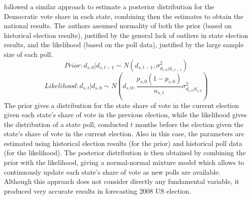 \documentclass[
  12pt]{article}
\begin{document}
\citep{loc:gel:2010} followed a similar approach to estimate a posterior
distribution for the Democratic vote share in each state, combining then
the estimates to obtain the national results. The authors assumed
normality of both the prior (based on historical election results),
justified by the general lack of outliers in state election results, and
the likelihood (based on the poll data), justified by the large sample
size of each poll.
\[Prior: d_{s,0}|d_{s,t-1} \sim N(d_{s,t-1}, \sigma^2_{d_{s,0}|d_{s,t-1}})\]
\[Likelihood: d_{s,t}|d_{s,0} \sim N(d_{s,0}, \frac{p_{s,0}(1-p_{s,0})}{n_{s,t}} \sigma^2_{d_{s,t}|d_{s,0}})\]
The prior gives a distribution for the state share of vote in the
current election given each state's share of vote in the previous
election, while the likelihood gives the distribution of a state poll,
conducted \(t\) months before the election given the state's share of
vote in the current election. Also in this case, the parameters are
estimated using historical election results (for the prior) and
historical poll data (for the likelihood). The posterior distribution is
then obtained by combining the prior with the likelihood, giving a
normal-normal mixture model which allows to continuously update each
state's share of vote as new polls are available. Although this approach
does not consider directly any fundamental variable, it produced very
accurate results in forecasting 2008 US election.
\end{document}
